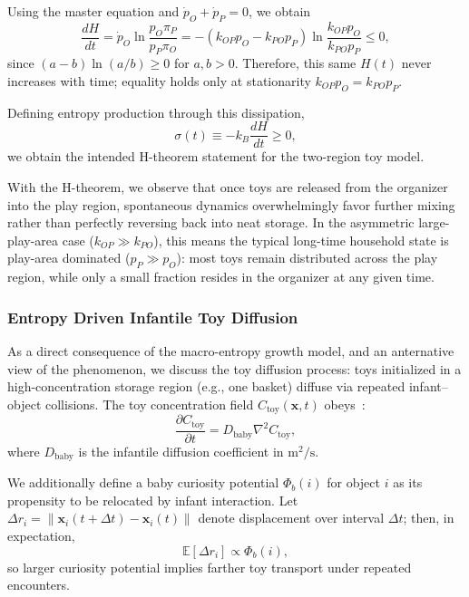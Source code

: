 \documentclass[11pt]{article}
\begin{document}
Using the master equation and $\dot p_O+\dot p_P=0$, we obtain
\begin{equation}
\frac{dH}{dt}=\dot p_O\ln\!\frac{p_O\pi_P}{p_P\pi_O}
= -\left(k_{OP}p_O-k_{PO}p_P\right)\ln\!\frac{k_{OP}p_O}{k_{PO}p_P}\le 0,
\end{equation}
since $(a-b)\ln(a/b)\ge 0$ for $a,b>0$. Therefore, this same $H(t)$ never increases with time; equality holds only at stationarity $k_{OP}p_O=k_{PO}p_P$.

Defining entropy production through this dissipation,
\begin{equation}
\sigma(t)\equiv -k_B\frac{dH}{dt}\ge 0,
\end{equation}
we obtain the intended H-theorem statement for the two-region toy model.

With the H-theorem, we observe that once toys are released from the organizer into the play region, spontaneous dynamics overwhelmingly favor further mixing rather than perfectly reversing back into neat storage. In the asymmetric large-play-area case ($k_{OP}\gg k_{PO}$), this means the typical long-time household state is play-area dominated ($p_P\gg p_O$): most toys remain distributed across the play region, while only a small fraction resides in the organizer at any given time.

\subsubsection*{Entropy Driven Infantile Toy Diffusion}

As a direct consequence of the macro-entropy growth model, and an anternative view of the phenomenon, we discuss the toy diffusion process: toys initialized in a high-concentration storage region (e.g., one basket) diffuse via repeated infant--object collisions. The toy concentration field $C_{\text{toy}}(\mathbf{x},t)$ obeys~\cite{Fick1855}:
\begin{equation}
\frac{\partial C_{\text{toy}}}{\partial t}=D_{\text{baby}}\nabla^2 C_{\text{toy}},
\end{equation}
where $D_{\text{baby}}$ is the infantile diffusion coefficient in $\mathrm{m^2/s}$.

We additionally define a baby curiosity potential $\Phi_b(i)$ for object $i$ as its propensity to be relocated by infant interaction. Let $\Delta r_i=\lVert \mathbf{x}_i(t+\Delta t)-\mathbf{x}_i(t)\rVert$ denote displacement over interval $\Delta t$; then, in expectation,
\begin{equation}
\mathbb{E}[\Delta r_i] \propto \Phi_b(i),
\end{equation}
so larger curiosity potential implies farther toy transport under repeated encounters.
\end{document}

